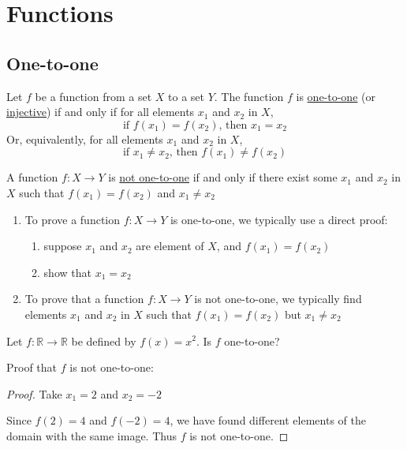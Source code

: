 \section{Functions}
\subsection{One-to-one}
\begin{definition}
    Let $f$ be a function from a set $X$ to a set $Y$. The function $f$ is \underline{one-to-one} (or \underline{injective}) if and only if for all elements $x_1$ and $x_2$ in $X$, $$\text{if } f(x_1) = f(x_2),\,\text{then } x_1 = x_2$$
    Or, equivalently, for all elements $x_1$ and $x_2$ in $X$, $$\text{if } x_1 \neq x_2,\,\text{then } f(x_1) \neq f(x_2)$$

    A function $f: X\rightarrow Y$ is \underline{not one-to-one} if and only if there exist some $x_1$ and $x_2$ in $X$ such that $f(x_1) = f(x_2)$ and $x_1 \neq x_2$
\end{definition}

\begin{enumerate}
\item To prove a function $f: X\rightarrow Y$ is one-to-one, we typically use a direct proof: \begin{enumerate}
    \item suppose $x_1$ and $x_2$ are element of $X$, and $f(x_1) = f(x_2)$
    \item show that $x_1 = x_2$
\end{enumerate}

\item To prove that a function $f: X\rightarrow Y$ is not one-to-one, we typically find elements $x_1$ and $x_2$ in $X$ such that $f(x_1) = f(x_2)$ but $x_1 \neq x_2$
\end{enumerate}

\begin{example}
    Let $f: \mathbb R \rightarrow \mathbb R$ be defined by $f(x) = x^2$. Is $f$ one-to-one?

    Proof that $f$ is not one-to-one:
    \begin{proof}
        Take $x_1 = 2$ and $x_2 = -2$

        Since $f(2) = 4$ and $f(-2) = 4$, we have found different elements of the domain with the same image. Thus $f$ is not one-to-one.
    \end{proof}
\end{example}

